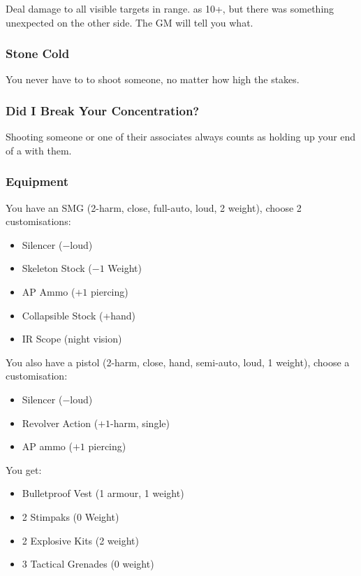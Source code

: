 {Deal damage to all visible targets in range.}
{as 10+, but there was something unexpected on the other side. The GM will tell you what.}

\subsubsection{Stone Cold} You never have to  to shoot someone, no matter how high the stakes.

\subsubsection{Did I Break Your Concentration?} Shooting someone or one of their associates always counts as holding up your end of a  with them.


\subsubsection{Equipment}
You have an SMG (2-harm, close, full-auto, loud, 2 weight), choose 2 customisations:
\begin{itemize}
\item Silencer ($-$loud)
\item Skeleton Stock ($-1$ Weight)
\item AP Ammo ($+1$ piercing)
\item Collapsible Stock (+hand)
\item IR Scope (night vision)
\end{itemize}

You also have a pistol (2-harm, close, hand, semi-auto, loud, 1 weight), choose a customisation:
\begin{itemize}
\item Silencer ($-$loud)
\item Revolver Action ($+1$-harm, single)
\item AP ammo ($+1$ piercing)
\end{itemize}

You get:
\begin{itemize}
\item Bulletproof Vest (1 armour, 1 weight)
\item 2 Stimpaks (0 Weight)
\item 2 Explosive Kits (2 weight)
\item 3 Tactical Grenades (0 weight)
\end{itemize}

